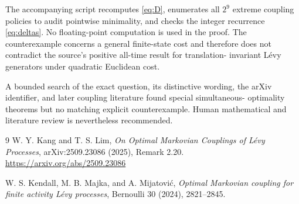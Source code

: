 \documentclass[11pt]{article}
\begin{document}
The accompanying script recomputes \eqref{eq:D}, enumerates all $2^9$ extreme
coupling policies to audit pointwise minimality, and checks the integer
recurrence \eqref{eq:deltas}.  No floating-point computation is used in the
proof.  The counterexample concerns a general finite-state cost and therefore
does not contradict the source's positive all-time result for translation-
invariant L\'evy generators under quadratic Euclidean cost.

A bounded search of the exact question, its distinctive wording, the arXiv
identifier, and later coupling literature found special simultaneous-
optimality theorems but no matching explicit counterexample.  Human
mathematical and literature review is nevertheless recommended.

\begin{thebibliography}{9}
W. Y. Kang and T. S. Lim,
\emph{On Optimal Markovian Couplings of L\'evy Processes},
arXiv:2509.23086 (2025), Remark 2.20.
\url{https://arxiv.org/abs/2509.23086}

W. S. Kendall, M. B. Majka, and A. Mijatovi\'c,
\emph{Optimal Markovian coupling for finite activity L\'evy processes},
Bernoulli 30 (2024), 2821--2845.
\end{thebibliography}
\end{document}
